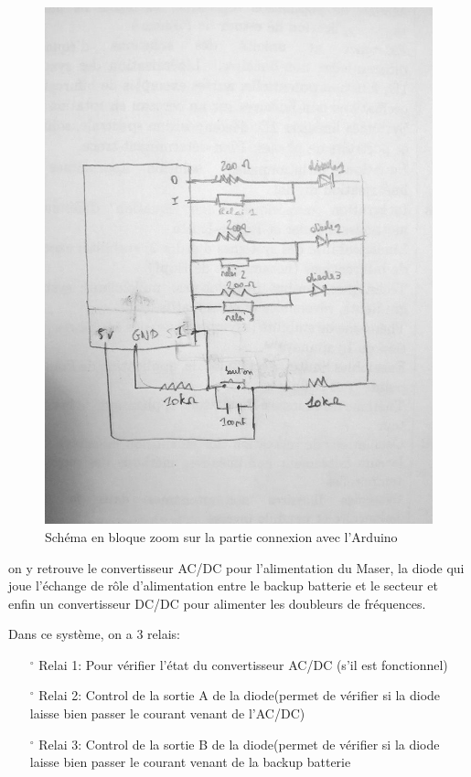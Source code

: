 \documentclass[12pt,a4paper]{article}
\begin{document}
\begin{figure}[!h]
\includegraphics[scale=0.30]{SCHEMA.jpg}
\caption{Schéma en bloque zoom sur la partie connexion avec l'Arduino}
\end{figure}



\newpage
on y retrouve le convertisseur AC/DC pour l'alimentation du Maser, la diode qui joue l'échange de rôle d'alimentation entre le backup batterie et le secteur et enfin un convertisseur DC/DC pour alimenter les doubleurs de fréquences. 

\newpage

Dans ce système, on a 3 relais:
\bigskip

\begin{itemize}
\item[$^{\circ}$] Relai 1: Pour vérifier l'état du convertisseur AC/DC (s'il est fonctionnel)

\bigskip

\item[$^{\circ}$] Relai 2: Control de la sortie A de la diode(permet de vérifier si la diode laisse bien passer le courant venant de l'AC/DC)

\bigskip

\item[$^{\circ}$] Relai 3: Control de la sortie B de la diode(permet de vérifier si la diode laisse bien passer le courant venant de la backup batterie
\end{itemize}
\end{document}
